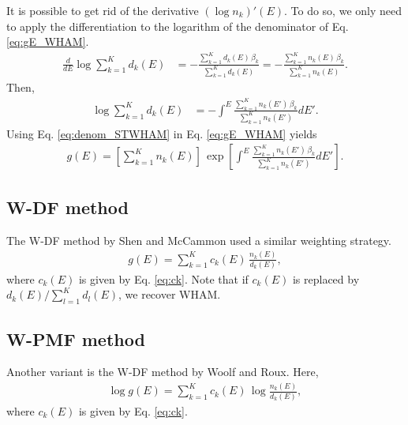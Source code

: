 \documentclass[aip,jcp,preprint,notitlepage, superscriptaddress]{revtex4-1}
\begin{document}
It is possible to get rid of
the derivative $(\log n_k)'(E)$.
%
To do so, we only need to apply the differentiation
to the logarithm of the denominator of Eq. \eqref{eq:gE_WHAM}.
%
\begin{align}
\frac{d}{dE}
\log
  \sum_{k = 1}^K d_k(E)
&=
-
\frac{
  \sum_{k = 1}^K d_k(E) \, \beta_k
}
{
  \sum_{k = 1}^K d_k(E)
}
=
-
\frac{
  \sum_{k = 1}^K n_k(E) \, \beta_k
}
{
  \sum_{k = 1}^K n_k(E)
}.
\label{eq:ddenom_STWHAM}
\end{align}
%
Then,
%
\begin{align}
\log \sum_{k = 1}^K d_k(E)
&=
-
\int^E
\frac{
  \sum_{k = 1}^K n_k(E') \, \beta_k
}
{
  \sum_{k = 1}^K n_k(E')
} dE'.
\label{eq:denom_STWHAM}
\end{align}
%
Using Eq. \eqref{eq:denom_STWHAM} in Eq. \eqref{eq:gE_WHAM} yields
%
\begin{align}
g(E)
=
\left[
  \sum_{k = 1}^K n_k(E)
\right]
\,
\exp
\left[
\int^E
    \frac{ \sum_{k = 1}^K n_k(E') \, \beta_k }
         { \sum_{k = 1}^K n_k(E') }
  dE'
\right].
\label{eq:g_STWHAM}
\end{align}



\subsection{W-DF method}



The W-DF method by Shen and McCammon\cite{
shen1991, roux1995}
used a similar weighting strategy.
%
\begin{align}
g(E) = \sum_{k = 1}^K c_k(E) \, \frac{ n_k(E) } { d_k(E) },
\end{align}
%
where $c_k(E)$ is given by Eq. \eqref{eq:ck}.
%
Note that
if $c_k(E)$
is replaced by $ d_k(E) / \sum_{l = 1}^K d_l(E)$,
we recover WHAM.



\subsection{W-PMF method}



Another variant is the W-DF method by Woolf and Roux\cite{
woolf1994, crouzy1994, roux1995}.
%
Here,
%
\begin{align}
\log g(E) = \sum_{k = 1}^K c_k(E) \, \log \frac{ n_k(E) } { d_k(E) },
\end{align}
%
where $c_k(E)$ is given by Eq. \eqref{eq:ck}.
%
\end{document}
